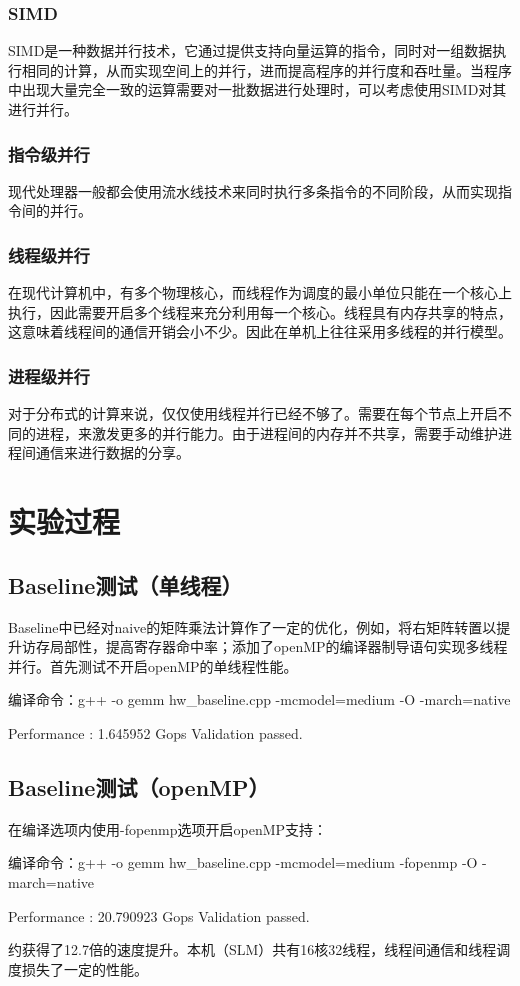 \documentclass[UTF8,10pt]{ctexart}
\begin{document}
\subsubsection{SIMD}
SIMD是一种数据并行技术，它通过提供支持向量运算的指令，同时对一组数据执行相同的计算，从而实现空间上的并行，进而提高程序的并行度和吞吐量。当程序中出现大量完全一致的运算需要对一批数据进行处理时，可以考虑使用SIMD对其进行并行。

\subsubsection{指令级并行}
现代处理器一般都会使用流水线技术来同时执行多条指令的不同阶段，从而实现指令间的并行。

\subsubsection{线程级并行}
在现代计算机中，有多个物理核心，而线程作为调度的最小单位只能在一个核心上执行，因此需要开启多个线程来充分利用每一个核心。线程具有内存共享的特点，这意味着线程间的通信开销会小不少。因此在单机上往往采用多线程的并行模型。

\subsubsection{进程级并行}
对于分布式的计算来说，仅仅使用线程并行已经不够了。需要在每个节点上开启不同的进程，来激发更多的并行能力。由于进程间的内存并不共享，需要手动维护进程间通信来进行数据的分享。

\section{实验过程}
\subsection{Baseline测试（单线程）}
Baseline中已经对naive的矩阵乘法计算作了一定的优化，例如，将右矩阵转置以提升访存局部性，提高寄存器命中率；添加了openMP的编译器制导语句实现多线程并行。首先测试不开启openMP的单线程性能。
\begin{python}
编译命令：g++ -o gemm hw_baseline.cpp -mcmodel=medium -O -march=native
\end{python}
\begin{python}
Performance : 1.645952 Gops
Validation passed.
\end{python}

\subsection{Baseline测试（openMP）}
在编译选项内使用-fopenmp选项开启openMP支持：
\begin{python}
编译命令：g++ -o gemm hw_baseline.cpp -mcmodel=medium -fopenmp -O -march=native
\end{python}
\begin{python}
Performance : 20.790923 Gops
Validation passed.
\end{python}
约获得了12.7倍的速度提升。本机（SLM）共有16核32线程，线程间通信和线程调度损失了一定的性能。
\end{document}
